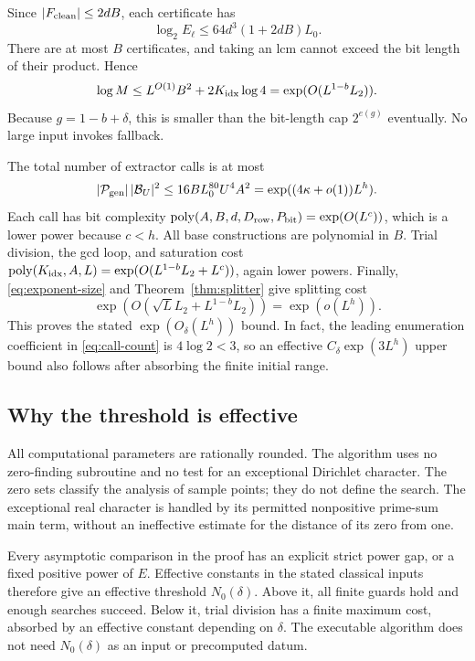 Since \(|F_{\rm clean}|\le2dB\), each certificate has
\[
 \log_2E_\ell\le64d^3(1+2dB)L_0.
\]
There are at most \(B\) certificates, and taking an lcm cannot
exceed the bit length of their product.  Hence
\begin{equation}\label{eq:exponent-size}
 \log M\le L^{O(1)}B^2+2K_{\rm idx}\log4
       =\exp(O(L^{1-b}L_2)).
\end{equation}
Because \(g=1-b+\delta\), this is smaller than the bit-length
cap \(2^{e(g)}\) eventually.  No large input invokes fallback.

The total number of extractor calls is at most
\begin{equation}\label{eq:call-count}
 |\mathcal P_{\rm gen}|\,|\mathcal B_U|^2
 \le16BL_0^{80}U^4A^2
       =\exp((4\kappa+o(1))L^h).
\end{equation}
Each call has bit complexity
\(\operatorname{poly}(A,B,d,D_{\rm row},P_{\rm bit})
=\exp(O(L^c))\), which is a lower power because \(c<h\).
All base constructions are polynomial in \(B\).  Trial division,
the gcd loop, and saturation cost
\(\operatorname{poly}(K_{\rm idx},A,L)
=\exp(O(L^{1-b}L_2+L^c))\), again lower powers.
Finally, \eqref{eq:exponent-size} and
Theorem~\ref{thm:splitter} give splitting cost
\[
 \exp(O(\sqrt L L_2+L^{1-b}L_2))=\exp(o(L^h)).
\]
This proves the stated \(\exp(O_\delta(L^h))\) bound.
In fact, the leading enumeration coefficient in
\eqref{eq:call-count} is \(4\log2<3\), so an effective
\(C_\delta\exp(3L^h)\) upper bound also follows after absorbing
the finite initial range.

\subsection{Why the threshold is effective}

All computational parameters are rationally rounded.  The algorithm
uses no zero-finding subroutine and no test for an exceptional
Dirichlet character.  The zero sets classify the analysis of sample
points; they do not define the search.  The exceptional real
character is handled by its permitted nonpositive prime-sum main
term, without an ineffective estimate for the distance of its zero
from one.

Every asymptotic comparison in the proof has an explicit strict
power gap, or a fixed positive power of \(E\).  Effective constants
in the stated classical inputs therefore give an effective
threshold \(N_0(\delta)\).  Above it, all finite guards hold and
enough searches succeed.  Below it, trial division has a finite
maximum cost, absorbed by an effective constant depending on
\(\delta\).  The executable algorithm does not need
\(N_0(\delta)\) as an input or precomputed datum.


